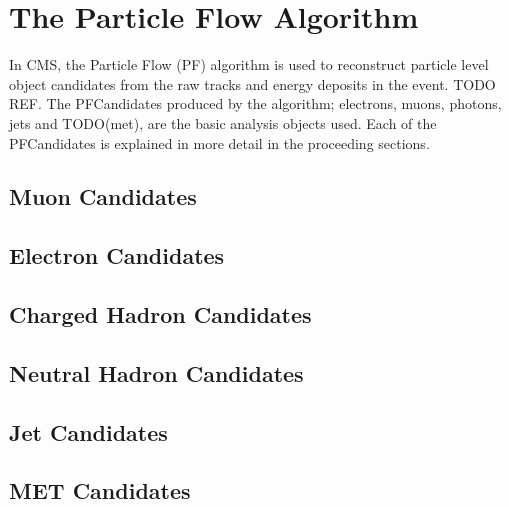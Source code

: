 \section{The Particle Flow Algorithm}
\label{sec:PFlow}

In CMS, the Particle Flow (PF) algorithm is used to reconstruct particle level object candidates from the raw tracks and energy deposits in the event. TODO REF. The PFCandidates produced by the algorithm; electrons, muons, photons, jets and TODO(met), are the basic analysis objects used.  
Each of the PFCandidates is explained in more detail in the proceeding sections.

\subsection{Muon Candidates}
\label{ssec:muCand}

\subsection{Electron Candidates}
\label{ssec:elCand}



\subsection{Charged Hadron Candidates}
\label{ssec:chHdCand}
\subsection{Neutral Hadron Candidates}
\label{ssec:nuHdCand}
\subsection{Jet Candidates}
\label{ssec:jetCand}


\subsection{MET Candidates}
\label{ssec:metCand}
